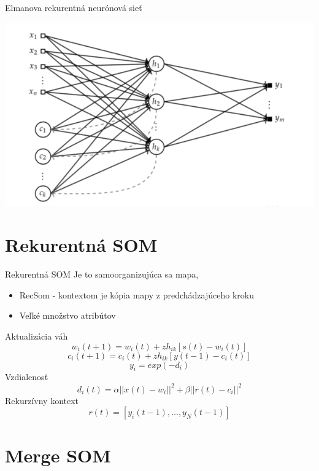 \documentclass[10pt]{beamer}
\begin{document}
\begin{frame}[fragile]{Elmanova rekurentná neurónová sieť}

\includegraphics[width=\textwidth]{elman}

\end{frame}


\section{Rekurentná SOM}

\begin{frame}[fragile]{Rekurentná SOM}
Je to samoorganizujúca sa mapa, 
\begin{itemize}
\item RecSom - kontextom je kópia mapy z predchádzajúceho kroku
\item Veľké množstvo atribútov
\end{itemize}
Aktualizácia váh
\begin{equation*}
w_i(t+1) = w_i(t) + zh_{ik}[s(t) - w_i(t)]
\end{equation*}
\begin{equation*}
c_i(t+1) = c_i(t) + zh_{ik}[y(t - 1) - c_i(t)]
\end{equation*}
\begin{equation*}
y_i=exp(-d_i)
\end{equation*}
Vzdialenosť
\begin{equation*}
d_i(t) = \alpha||x(t)-w_i||^2 + \beta||r(t)-c_i||^2
\end{equation*}
Rekurzívny kontext
\begin{equation*}
r(t)=[y_i(t-1),...,y_N(t-1)]
\end{equation*}
\end{frame}

\section{Merge SOM}
\end{document}
